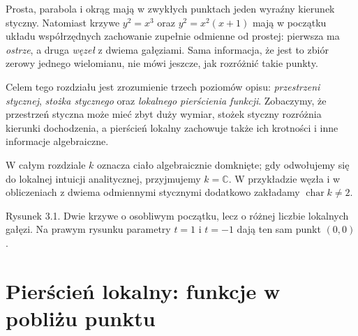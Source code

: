 \documentclass[11pt,a4paper,openany]{report}
\numberwithin{equation}{section}
\theoremstyle{plain}
\theoremstyle{definition}
\theoremstyle{remark}
\newcommand{\C}{\mathbb C}
\begin{document}
Prosta, parabola i okrąg mają w zwykłych punktach jeden wyraźny
kierunek styczny. Natomiast krzywe $y^2=x^3$ oraz
$y^2=x^2(x+1)$ mają w początku układu współrzędnych
zachowanie zupełnie odmienne od prostej: pierwsza ma
\emph{ostrze}, a druga \emph{węzeł} z dwiema gałęziami.
Sama informacja, że jest to zbiór zerowy jednego wielomianu,
nie mówi jeszcze, jak rozróżnić takie punkty.

Celem tego rozdziału jest zrozumienie trzech poziomów opisu:
\emph{przestrzeni stycznej}, \emph{stożka stycznego} oraz
\emph{lokalnego pierścienia funkcji}. Zobaczymy, że przestrzeń
styczna może mieć zbyt duży wymiar, stożek styczny rozróżnia
kierunki dochodzenia, a pierścień lokalny zachowuje także
ich krotności i inne informacje algebraiczne.

W całym rozdziale $k$ oznacza ciało algebraicznie domknięte;
gdy odwołujemy się do lokalnej intuicji analitycznej,
przyjmujemy $k=\C$. W przykładzie węzła i w obliczeniach
z dwiema odmiennymi stycznymi dodatkowo zakładamy
$\operatorname{char}k\ne2$.

\begin{center}

\small Rysunek 3.1. Dwie krzywe o osobliwym początku, lecz o różnej
liczbie lokalnych gałęzi. Na prawym rysunku parametry $t=1$ i $t=-1$
dają ten sam punkt $(0,0)$.
\end{center}

\section{Pierścień lokalny: funkcje w pobliżu punktu}
\end{document}
